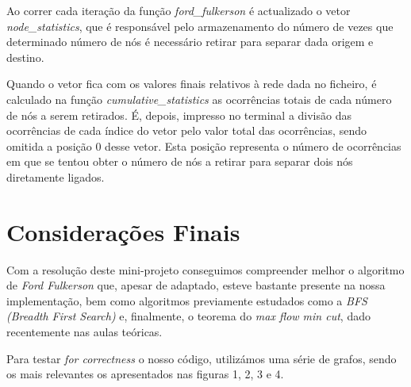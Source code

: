 \documentclass[a4paper]{article}
\begin{document}
Ao correr cada iteração da função \textit{ford\_fulkerson} é actualizado o vetor \textit{node\_statistics}, que é responsável pelo armazenamento do número de vezes que determinado número de nós é necessário retirar para separar dada origem e destino.

Quando o vetor fica com os valores finais relativos à rede dada no ficheiro, é calculado na função \textit{cumulative\_statistics} as ocorrências totais de cada número de nós a serem retirados. É, depois, impresso no terminal a divisão das ocorrências de cada índice do vetor pelo valor total das ocorrências, sendo omitida a posição 0 desse vetor. Esta posição representa o número de ocorrências em que se tentou obter o número de nós a retirar para separar dois nós diretamente ligados. 


\section{Considerações Finais}
Com a resolução deste mini-projeto conseguimos compreender melhor o algoritmo de \textit{Ford Fulkerson} que, apesar de adaptado, esteve bastante presente na nossa implementação, bem como algoritmos previamente estudados como a \textit{BFS (Breadth First Search)} e, finalmente, o teorema do \textit{max flow min cut}, dado recentemente nas aulas teóricas.

Para testar \textit{for correctness} o nosso código, utilizámos uma série de grafos, sendo os mais relevantes os apresentados nas figuras 1, 2, 3 e 4.
\end{document}
